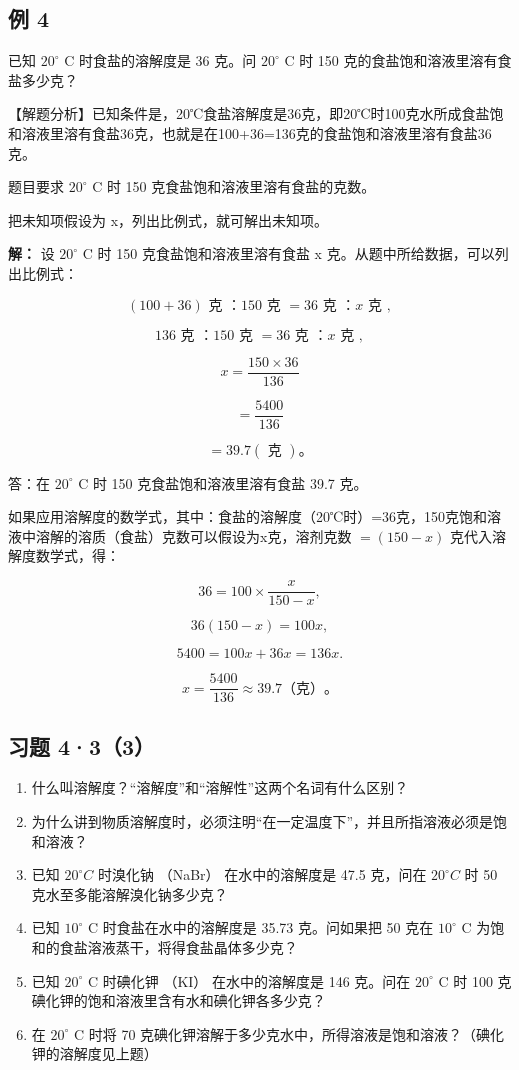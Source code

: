 \subsection{例 4}

已知 \(20^{\circ}\) C 时食盐的溶解度是 36 克。问 \(20^{\circ}\) C 时 150
克的食盐饱和溶液里溶有食盐多少克？

【解题分析】已知条件是，20℃食盐溶解度是36克，即20℃时100克水所成食盐饱和溶液里溶有食盐36克，也就是在100+36=136克的食盐饱和溶液里溶有食盐36克。

题目要求 \(20^{\circ}\) C 时 150 克食盐饱和溶液里溶有食盐的克数。

把未知项假设为 x，列出比例式，就可解出未知项。

\textbf{解：} 设 \(20^{\circ}\) C 时 150 克食盐饱和溶液里溶有食盐 x
克。从题中所给数据，可以列出比例式：

\[
(100 + 36) \text{ 克 }\text{：} 150 \text{ 克 } = 36 \text{ 克 }\text{：} x \text{ 克 },
\]

\[
136 \text{ 克 }\text{：} 150 \text{ 克 } = 36 \text{ 克 }\text{：} x \text{ 克 },
\]

\[
x = \frac {150 \times 36}{136}
\]

\[
=\frac{5400}{136}
\]

\[
= 39.7 (\text{ 克 })\text{。}
\]

答：在 \(20^{\circ}\) C 时 150 克食盐饱和溶液里溶有食盐 39.7 克。

如果应用溶解度的数学式，其中：食盐的溶解度（20℃时）=36克，150克饱和溶液中溶解的溶质（食盐）克数可以假设为x克，溶剂克数
\(= (150 - x)\) 克代入溶解度数学式，得：

\[
36 = 100 \times \frac {x}{150 - x},
\]

\[
36 (150 - x) = 100 x,
\]

\[
5400=100x+36x=136x.
\]

\[
x=\frac{5400}{136}\approx39.7\text{（克）}\text{。}
\]

\subsection{习题 4·3（3）}

\begin{enumerate}
\item
  什么叫溶解度？``溶解度''和``溶解性''这两个名词有什么区别？
\item
  为什么讲到物质溶解度时，必须注明``在一定温度下''，并且所指溶液必须是饱和溶液？
\item
  已知 \(20^{\circ}C\) 时溴化钠 （NaBr） 在水中的溶解度是 47.5 克，问在
  \(20^{\circ}C\) 时 50 克水至多能溶解溴化钠多少克？
\item
  已知 \(10^{\circ}\) C 时食盐在水中的溶解度是 35.73 克。问如果把 50
  克在 \(10^{\circ}\) C 为饱和的食盐溶液蒸干，将得食盐晶体多少克？
\item
  已知 \(20^{\circ}\) C 时碘化钾 （KI） 在水中的溶解度是 146 克。问在
  \(20^{\circ}\) C 时 100 克碘化钾的饱和溶液里含有水和碘化钾各多少克？
\item
  在 \(20^{\circ}\) C 时将 70
  克碘化钾溶解于多少克水中，所得溶液是饱和溶液？（碘化钾的溶解度见上题）
\end{enumerate}

